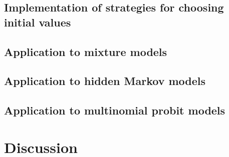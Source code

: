 \hypertarget{implementation-of-strategies-for-choosing-initial-values}{%
\subsection{Implementation of strategies for choosing initial values}\label{implementation-of-strategies-for-choosing-initial-values}}

\hypertarget{application-to-mixture-models}{%
\subsection{Application to mixture models}\label{application-to-mixture-models}}

\hypertarget{application-to-hidden-markov-models}{%
\subsection{Application to hidden Markov models}\label{application-to-hidden-markov-models}}

\hypertarget{application-to-multinomial-probit-models}{%
\subsection{Application to multinomial probit models}\label{application-to-multinomial-probit-models}}

\hypertarget{discussion}{%
\section{Discussion}\label{discussion}}



\address{%
Lennart Oelschläger\\
Bielefeld University\\%
Department of Business Administration and Economics\\ Bielefeld, Germany\\
%
\url{https://loelschlaeger.de/}\\%
%
\href{mailto:lennart.oelschlaeger@uni-bielefeld.de}{\nolinkurl{lennart.oelschlaeger@uni-bielefeld.de}}%
}

\address{%
Marius Ötting\\
Bielefeld University\\%
Department of Business Administration and Economics\\ Bielefeld, Germany\\
%
\url{https://www.uni-bielefeld.de/fakultaeten/wirtschaftswissenschaften/lehrbereiche/stats/team/marius-otting-(m.sc}.)/\\%
\textit{ORCiD: \href{https://orcid.org/0000-0002-9373-0365}{0000-0002-9373-0365}}\\%
\href{mailto:marius.oetting@uni-bielefeld.de}{\nolinkurl{marius.oetting@uni-bielefeld.de}}%
}
